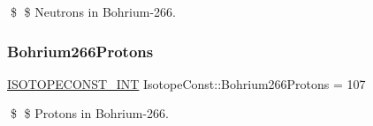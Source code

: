 \$ \$ Neutrons in Bohrium-\/266. \mbox{\label{group___isotope_const-_bohrium-_bh266_gaac734ea218a0169206acaa01c0f919ee}} 
\subsubsection{\texorpdfstring{Bohrium266\+Protons}{Bohrium266Protons}}
{\footnotesize\ttfamily \mbox{\hyperlink{group___isotope_const-_macros_ga5f18360b3e99483a35c32d789e62621c}{I\+S\+O\+T\+O\+P\+E\+C\+O\+N\+S\+T\+\_\+\+I\+NT}} Isotope\+Const\+::\+Bohrium266\+Protons = 107}

\$ \$ Protons in Bohrium-\/266. 